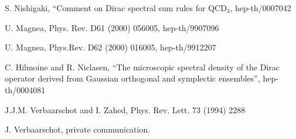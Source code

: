 \documentclass[a4paper,10pt]{article}
\begin{document}
\begin{thebibliography}{99}


 S. Nishigaki, ``Comment on Dirac spectral sum rules for 
QCD$_3$, hep-th/0007042

 U. Magnea, Phys. Rev. D61 (2000) 056005, hep-th/9907096 

 U. Magnea, Phys.Rev. D62 (2000) 016005, hep-th/9912207

 C. Hilmoine and R. Niclasen, ``The microscopic spectral 
density of the Dirac operator derived from Gaussian orthogonal and symplectic 
ensembles'', hep-th/0004081



 J.J.M. Verbaarschot and I. Zahed, Phys. Rev. Lett. 73 (1994) 2288

 J. Verbaarschot, private communication. 

\end{thebibliography}
\end{document}
